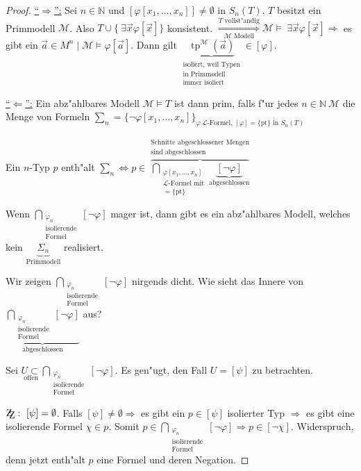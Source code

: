 \documentclass[a4paper,12pt,numbers=noenddot,parskip=full]{scrartcl}
\newcommand{\setN}{\mathbb{N}}
\newcommand{\Exists}{~\exists}
\newcommand{\scrL}{\mathcal{L}}
\newcommand{\scrM}{\mathcal{M}}
\newcommand{\zz}{\mathrm{Z\kern-.3em\raise-0.5ex\hbox{Z}}:~}
\DeclareMathOperator{\typ}{tp}
\theoremstyle{dotless}
\begin{document}
\begin{proof}
	\underline{"`$\Rightarrow$"':} Sei $n \in \setN$ und $[\varphi[x_1, \dots, x_n]] \neq \emptyset$ in $S_n(T)$. $T$ besitzt ein Primmodell $\scrM$. Also $T \cup \{\Exists \vec{x} \varphi[\vec{x}]\}$ konsistent. $\overset{T \text{ vollst"andig}}{\underset{\scrM \text{ Modell}}{\Longrightarrow}} \scrM \models \Exists \vec{x} \varphi[\vec{x}] \Rightarrow$ es gibt ein $\vec{a} \in M^n \mid \scrM \models \varphi[\vec{a}]$. Dann gilt $\underbrace{\typ^\scrM(\vec{a})}_{\substack{\text{isoliert, weil Typen}\\\text{in Primmodell}\\\text{immer isoliert}}} \in [\varphi]$.
	
	\underline{"`$\Leftarrow$"':} Ein abz"ahlbares Modell $\scrM \models T$ ist dann prim, falls f"ur jedes $n \in \setN ~\scrM$ die Menge von Formeln $\sum_n = \{\lnot \varphi[x_1, \dots, x_n] \}_{\varphi~ \scrL \text{-Formel, } [\varphi] = \{\text{pt} \} \text{ in }S_n(T)}$
	
	Ein $n$-Typ $p$ enth"alt $\sum_n \Leftrightarrow p \in \overbrace{\bigcap\limits_{\substack{\varphi[x_1, \dots, x_n]\\\scrL \text{-Formel mit}\\ [\varphi]= \{\text{pt}\}}} \underbrace{[\lnot \varphi]}_{\text{abgeschlossen}}}^{\substack{\text{Schnitte abgeschlossener Mengen}\\ \text{sind abgeschlossen}}}$
	
	Wenn $\bigcap\limits_{\substack{\varphi_n\\\text{isolierende}\\\text{Formel}}} [\lnot \varphi]$ mager ist, dann gibt es ein abz"ahlbares Modell, welches kein $\underbrace{\Sigma_n}_\text{Primmodell}$ realisiert.
	
	Wir zeigen $\bigcap\limits_{\substack{\varphi_n\\\text{isolierende}\\\text{Formel}}} [\lnot \varphi]$ nirgends dicht. Wie sieht das Innere von $\underbrace{\bigcap\limits_{\substack{\varphi_n\\\text{isolierende}\\\text{Formel}}} [\lnot \varphi]}_\text{abgeschlossen}$ aus?
	
	Sei $\underset{\text{offen}}{U \subset} \bigcap\limits_{\substack{\varphi_n\\\text{isolierende}\\\text{Formel}}} [\lnot \varphi]$. Es gen"ugt, den Fall $U = [\psi]$ zu betrachten.
	
	$\zz [\psi] = \emptyset$. Falls $[\psi] \neq \emptyset \Rightarrow $ es gibt ein $p \in [\psi]$ isolierter Typ $\Longrightarrow$ es gibt eine isolierende Formel $\chi \in p$. Somit $ p \in \bigcap\limits_{\substack{\varphi_n\\\text{isolierende}\\\text{Formel}}} [\lnot \varphi] \Longrightarrow p \in [\lnot \chi]$. Widerspruch, denn jetzt enth"alt $p$ eine Formel und deren Negation.
\end{proof}
\end{document}
